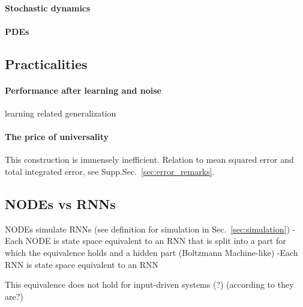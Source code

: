 \documentclass{article}
\theoremstyle{definition} \newtheorem{definition}{Definition}
\theoremstyle{remark} \newtheorem{remark}{Remark}
\newcounter{ct}
\begin{document}
\paragraph{Stochastic dynamics}
\citep{gonon2019reservoir}
\citep{hart2021echo}
\citep{chen2022universal} 
\citep{wei2022statistically}
\citep{bishop2023recurrent}
\citep{plate2024optimal}
\citep{mishne2024elucidating}
\citep{lipman2024flow}

\paragraph{PDEs}
\citep{richter2022neural}

\subsection{Practicalities}
\paragraph{Performance after learning and noise}
learning related generalization \citep{marion2023generalization}\citep{bleistein2023generalization}

\paragraph{The price of universality}
This construction is immensely inefficient.
Relation to mean squared error and total integrated error, see Supp.Sec.~\ref{sec:error_remarks}.


\subsection{NODEs vs RNNs}
NODEs simulate RNNs (see definition for simulation in Sec.~\ref{sec:simulation})
- Each NODE is state space equivalent to an RNN that is split into a part for which the equivalence holds and a hidden part (Boltzmann Machine-like)
-Each RNN is state space equivalent to an RNN

This equivalence does not hold for input-driven systems (?)  (according to \citep{dinc2025latentcomputing} they are?)

\end{document}
